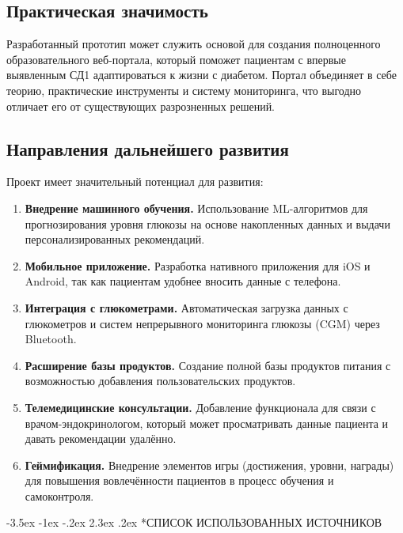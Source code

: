 \documentclass[14pt, a4paper]{extarticle}
\makeatletter
\renewcommand\section{\@startsection {section}{1}{\z@}%
{-3.5ex \@plus -1ex \@minus -.2ex}%
{2.3ex \@plus.2ex}%
{\centering\normalfont\Large\bfseries}}
\makeatother
\begin{document}
\subsection*{Практическая значимость}

\noindent Разработанный прототип может служить основой для создания полноценного образовательного веб-портала, который поможет пациентам с впервые выявленным СД1 адаптироваться к жизни с диабетом. Портал объединяет в себе теорию, практические инструменты и систему мониторинга, что выгодно отличает его от существующих разрозненных решений.

\subsection*{Направления дальнейшего развития}

\noindent Проект имеет значительный потенциал для развития:

\begin{enumerate}
\item \textbf{Внедрение машинного обучения.} Использование ML-алгоритмов для прогнозирования уровня глюкозы на основе накопленных данных и выдачи персонализированных рекомендаций.

\item \textbf{Мобильное приложение.} Разработка нативного приложения для iOS и Android, так как пациентам удобнее вносить данные с телефона.

\item \textbf{Интеграция с глюкометрами.} Автоматическая загрузка данных с глюкометров и систем непрерывного мониторинга глюкозы (CGM) через Bluetooth.

\item \textbf{Расширение базы продуктов.} Создание полной базы продуктов питания с возможностью добавления пользовательских продуктов.

\item \textbf{Телемедицинские консультации.} Добавление функционала для связи с врачом-эндокринологом, который может просматривать данные пациента и давать рекомендации удалённо.

\item \textbf{Геймификация.} Внедрение элементов игры (достижения, уровни, награды) для повышения вовлечённости пациентов в процесс обучения и самоконтроля.
\end{enumerate}

\newpage
{}
\section*{СПИСОК ИСПОЛЬЗОВАННЫХ ИСТОЧНИКОВ}
\end{document}
